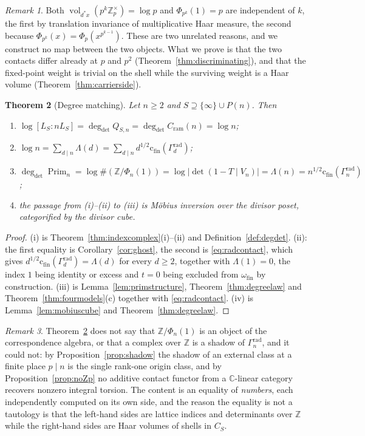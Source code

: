 \documentclass[11pt]{amsart}
\newtheorem{theorem}{Theorem}[section]
\theoremstyle{definition}
\theoremstyle{remark}
\newtheorem{remark}[theorem]{Remark}
\newcommand{\C}{\mathbb C}
\newcommand{\Z}{\mathbb Z}
\newcommand{\Prim}{\operatorname{Prim}}
\newcommand{\vol}{\operatorname{vol}}
\newcommand{\degdet}{\operatorname{deg}_{\mathrm{det}}}
\newcommand{\cfin}{\mathrm{c}_{\mathrm{fin}}}
\begin{document}
\begin{remark}\label{rem:nomapsupplied}
Both $\vol_{d^*x}(p^k\Z_p^\times)=\log p$ and $\Phi_{p^k}(1)=p$ are independent
of $k$, the first by translation invariance of multiplicative Haar measure, the
second because $\Phi_{p^k}(x)=\Phi_p(x^{p^{k-1}})$. These are two unrelated
reasons, and we construct no map between the two objects.  What we prove is
that the two contacts differ already at $p$ and $p^2$
(Theorem~\ref{thm:discriminating}), and that the fixed-point weight is trivial
on the shell while the surviving weight is a Haar volume
(Theorem~\ref{thm:carrierside}).
\end{remark}

\begin{theorem}[Degree matching]\label{thm:degreematching}
Let $n\ge2$ and $S\supseteq\{\infty\}\cup P(n)$. Then
\begin{enumerate}
\item[(i)] $\log[L_S:nL_S]=\degdet Q_{S,n}=\degdet C_{\mathrm{ram}}(n)
=\log n$;
\item[(ii)] $\log n=\sum_{d\mid n}\Lambda(d)
=\sum_{d\mid n}d^{1/2}\cfin(\Gamma_d^{\mathrm{rad}})$;
\item[(iii)] $\degdet\Prim_n=\log\#(\Z/\Phi_n(1))=\log|\det(1-T\mid V_n)|
=\Lambda(n)=n^{1/2}\cfin(\Gamma_n^{\mathrm{rad}})$;
\item[(iv)] the passage from (i)--(ii) to (iii) is M\"obius inversion over the
divisor poset, categorified by the divisor cube.
\end{enumerate}
\end{theorem}

\begin{proof}
(i) is Theorem~\ref{thm:indexcomplex}(i)--(ii) and
Definition~\ref{def:degdet}. (ii): the first equality is
Corollary~\ref{cor:ghost}, the second is \eqref{eq:radcontact}, which gives
$d^{1/2}\cfin(\Gamma_d^{\mathrm{rad}})=\Lambda(d)$ for every $d\ge2$, together
with $\Lambda(1)=0$, the index $1$ being identity or excess and $t=0$ being
excluded from $\omega_{\mathrm{fin}}$ by construction. (iii) is
Lemma~\ref{lem:primstructure}, Theorem~\ref{thm:degreelaw} and
Theorem~\ref{thm:fourmodels}(c) together with
\eqref{eq:radcontact}. (iv) is Lemma~\ref{lem:mobiuscube} and
Theorem~\ref{thm:degreelaw}.
\end{proof}

\begin{remark}\label{rem:whatdegmatchdoesnotsay}
Theorem~\ref{thm:degreematching} does not say that $\Z/\Phi_n(1)$ is an object
of the correspondence algebra, or that a complex over $\Z$ is a shadow of
$\Gamma_n^{\mathrm{rad}}$, and it could not: by Proposition~\ref{prop:shadow} the
shadow of an external class at a finite place $p\mid n$ is the single rank-one
origin class, and by Proposition~\ref{prop:noZp} no additive contact functor
from a $\C$-linear category recovers nonzero integral torsion. The content is
an equality of \emph{numbers}, each independently computed on its own side, and
the reason the equality is not a tautology is that the left-hand sides are
lattice indices and determinants over $\Z$ while the right-hand sides are Haar
volumes of shells in $C_S$.
\end{remark}
\end{document}
